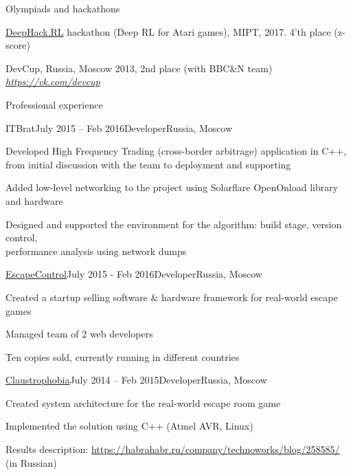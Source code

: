 \documentclass{resume} %
\begin{document}
\begin{rSection}{Olympiads and hackathons}
\item \href{http://rl.deephack.me/}{DeepHack.RL} hackathon (Deep RL for Atari games), MIPT, 2017. 4'th place (z-score)
\item DevCup, Russia, Moscow 2013, 2nd place (with BBC\&N team)\\
\hfill {\em \url{https://vk.com/devcup}}
\end{rSection}


\begin{rSection}{Professional experience}
\begin{rSubsection}{ITBrat}{July 2015 -- Feb 2016}{Developer}{Russia, Moscow}
	\item Developed High Frequency Trading (cross-border arbitrage) application in C++, from initial discussion with the team to deployment and supporting
	\item Added low-level networking to the project using Solarflare OpenOnload library and hardware
	\item Designed and supported the environment for the algorithm: build stage, version control,\\ performance analysis using network dumps
\end{rSubsection}
	
\begin{rSubsection}{\href{http://escapecontrol.ru}{EscapeControl}}{July 2015 - Feb 2016}{Developer}{Russia, Moscow}
	\item Created a startup selling software \& hardware framework for real-world escape games
	\item Managed team of 2 web developers
	\item Ten copies sold, currently running in different countries
\end{rSubsection}
\newpage
\begin{rSubsection}{\href{http://phobia.ru}{Claustrophobia}}{July 2014 -- Feb 2015}{Developer}{Russia, Moscow}
	\item Created system architecture for the real-world escape room game
	\item Implemented the solution using C++ (Atmel AVR, Linux)
	\item Results description: \url{https://habrahabr.ru/company/technoworks/blog/258585/} (in Russian)
\end{rSubsection}
		
\end{rSection}
\end{document}
